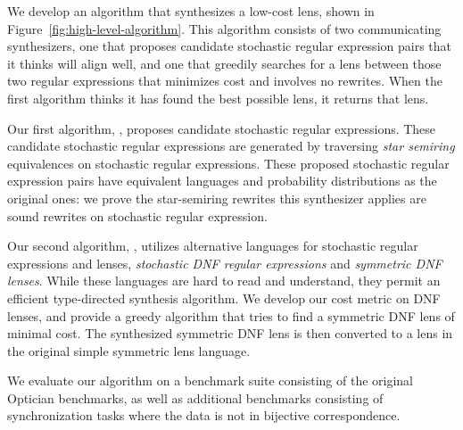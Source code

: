 \documentclass[acmsmall,screen,anonymous]{acmart}
\begin{document}
We develop an algorithm that synthesizes a low-cost lens, shown in
Figure~\ref{fig:high-level-algorithm}. This algorithm consists of two
communicating synthesizers, one that proposes candidate stochastic regular
expression pairs that it thinks will align well, and one that greedily searches
for a lens between those two regular expressions that minimizes cost and
involves no rewrites. When the first algorithm thinks it has found the best
possible lens, it returns that lens.

Our first algorithm, \RXSearch, proposes candidate stochastic regular
expressions. These candidate stochastic regular expressions are generated by
traversing \emph{star semiring} equivalences on stochastic regular expressions.
These proposed stochastic regular expression pairs have equivalent languages and
probability distributions as the original ones: we prove the star-semiring
rewrites this synthesizer applies are sound rewrites on stochastic regular
expression.

Our second algorithm, \GreedySynth, utilizes alternative languages for
stochastic regular expressions and lenses, \emph{stochastic DNF regular
  expressions} and \emph{symmetric DNF lenses}. While these languages are hard
to read and understand, they permit an efficient type-directed synthesis
algorithm. We develop our cost metric on DNF lenses, and provide a greedy
algorithm that tries to find a symmetric DNF lens of minimal cost. The
synthesized symmetric DNF lens is then converted to a lens in the original
simple symmetric lens language.

We evaluate our algorithm on a benchmark suite consisting of the original
Optician benchmarks, as well as additional benchmarks consisting of
synchronization tasks where the data is not in bijective correspondence.
\end{document}
